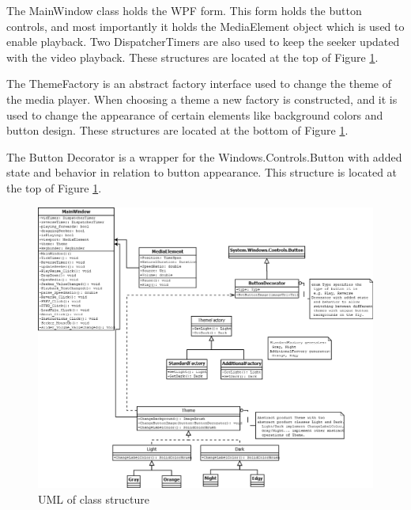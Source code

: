\documentclass[10pt,conference,onecolumn,compsoc]{IEEEtran}
\begin{document}
The MainWindow class holds the WPF form. This form holds the button controls, and most importantly it holds the MediaElement object which is used to enable playback. Two DispatcherTimers are also used to keep the seeker updated with the video playback. These structures are located at the top of Figure \ref{MainUML}.\par
The ThemeFactory is an abstract factory interface used to change the theme of the media player. When choosing a theme a new factory is constructed, and it is used to change the appearance of certain elements like background colors and button design. These structures are located at the bottom of Figure \ref{MainUML}.\par
The Button Decorator is a wrapper for the Windows.Controls.Button with added state and behavior in relation to button appearance. This structure is located at the top of Figure \ref{MainUML}.
\begin{figure}[H]
\begin{center}
\includegraphics[scale=0.4]{MediaPlayerUML.png}
\caption{UML of class structure}
\label{MainUML}
\end{center}
\end{figure}
\end{document}
